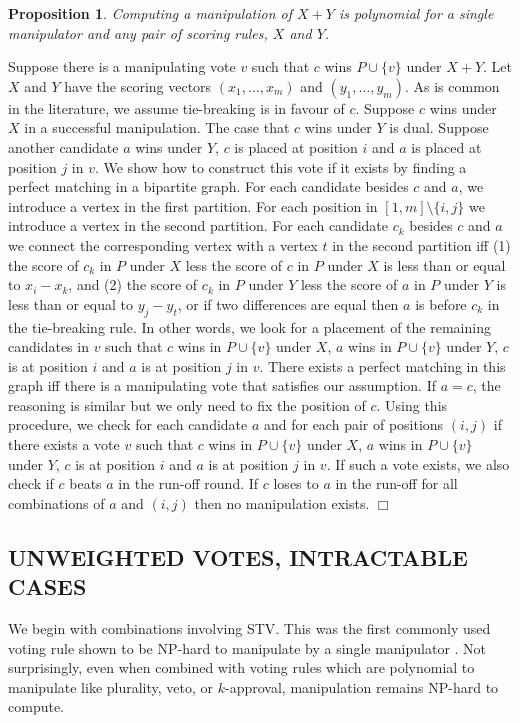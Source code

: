 \documentclass{ecai2012}
\newcommand{\winner}[2]{\mbox{$#1 + #2$}}
\newtheorem{proposition}{Proposition}
\newcommand{\myproof}{\vspace{-3mm}\noindent {\bf Proof:\ \ }}
\newcommand{\myqed}{\mbox{$\Box$}}
\begin{document}
\begin{proposition}
Computing a manipulation of $\winner{X}{Y}$ is
polynomial for a single manipulator and any pair of
scoring rules, $X$ and $Y$.
\end{proposition}
\myproof
Suppose there is a manipulating vote $v$ such that $c$
wins $P \cup \{v\}$ under $\winner{X}{Y}$. Let $X$ and $Y$
have the scoring vectors $(x_1,\ldots,x_m)$ and $(y_1,\ldots,y_m)$.
As is common in the literature, we assume tie-breaking
is in favour of $c$. Suppose $c$ wins under $X$
in a successful  manipulation. The case that $c$ wins
under $Y$ is dual.
Suppose another candidate $a$ wins
under $Y$, $c$ is placed at position $i$ and $a$ is placed at position
$j$ in $v$. We show how to construct this vote if it exists by
finding a perfect matching in a bipartite graph.
For each candidate besides $c$ and $a$, we introduce
a vertex in the first partition. %
For each position in $[1,m] \setminus \{i,j\}$
we introduce a vertex in the second partition. %
For each candidate $c_k$ besides $c$ and $a$
we connect the corresponding vertex with a vertex $t$ in the second
partition iff (1) the score of $c_k$ in $P$ under
$X$ less the
score of $c$ in $P$ under $X$ is less than
or equal to $x_i - x_k$,
and
(2) the score of $c_k$ in $P$ under
$Y$ less the score of $a$ in $P$ under $Y$ is less than
or equal to $y_j - y_t$,
or if two differences are equal then $a$ is before
$c_k$ in the tie-breaking rule.
In other words, we look for a placement of the
remaining candidates in
$v$ such that $c$ wins in $P\cup \{v\}$ under $X$,
$a$ wins in $P\cup \{v\}$ under $Y$, $c$ is at position $i$ and $a$
is at position $j$
in $v$. There exists a perfect matching in this graph iff
there is a manipulating vote
that satisfies our assumption.
If $a=c$, the reasoning is similar but we only need to fix
the position of $c$.
Using this procedure, we check for each candidate $a$
and for each pair of positions $(i,j)$
if there exists a vote $v$ such that
$c$ wins in $P\cup \{v\}$ under $X$,
$a$ wins in $P\cup \{v\}$ under $Y$, $c$ is at position $i$ and $a$ is at position $j$
in $v$. If such a vote exists,  we also check if $c$ beats $a$ in the run-off round.
If $c$ loses to $a$ in the run-off for all combinations of $a$ and $(i,j)$
then  no manipulation exists.
\myqed



\subsection*{UNWEIGHTED VOTES, INTRACTABLE CASES}
\vspace{-1mm}
We begin with combinations involving STV.
This was the first commonly used
voting rule shown to be NP-hard to manipulate
by a single manipulator \cite{stvhard}. Not surprisingly,
even when combined with voting rules which are polynomial
to manipulate like plurality, veto, or
$k$-approval, manipulation %
remains NP-hard
to compute.
\end{document}
